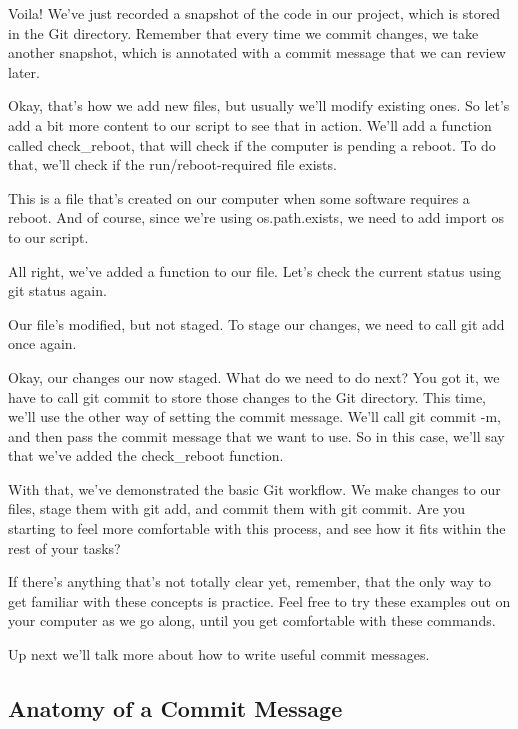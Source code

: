 	Voila! We've just recorded a snapshot of the code in our project, which is stored in the Git directory. Remember that every time we commit changes, we take another snapshot, which is annotated with a commit message that we can review later.
	
	Okay, that's how we add new files, but usually we'll modify existing ones. So let's add a bit more content to our script to see that in action. We'll add a function called check_reboot, that will check if the computer is pending a reboot. To do that, we'll check if the run/reboot-required file exists.
	
	This is a file that's created on our computer when some software requires a reboot. And of course, since we're using os.path.exists, we need to add import os to our script.
	
	All right, we've added a function to our file. Let's check the current status using git status again.
	
	Our file's modified, but not staged. To stage our changes, we need to call git add once again.
	
	Okay, our changes our now staged. What do we need to do next? You got it, we have to call git commit to store those changes to the Git directory. This time, we'll use the other way of setting the commit message. We'll call git commit -m, and then pass the commit message that we want to use. So in this case, we'll say that we've added the check_reboot function.
	
	With that, we've demonstrated the basic Git workflow. We make changes to our files, stage them with git add, and commit them with git commit. Are you starting to feel more comfortable with this process, and see how it fits within the rest of your tasks?
	
	If there's anything that's not totally clear yet, remember, that the only way to get familiar with these concepts is practice. Feel free to try these examples out on your computer as we go along, until you get comfortable with these commands.
	
	Up next we'll talk more about how to write useful commit messages.
	
	\subsection{Anatomy of a Commit Message}
	
